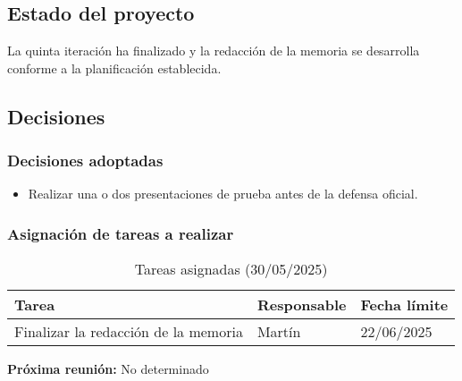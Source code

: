 \subsection{Estado del proyecto}
La quinta iteración ha finalizado y la redacción de la memoria se desarrolla conforme a la planificación establecida.
\subsection{Decisiones}
\subsubsection{Decisiones adoptadas}
\begin{itemize}
    \item Realizar una o dos presentaciones de prueba antes de la defensa oficial.
\end{itemize}
\subsubsection{Asignación de tareas a realizar}
\begin{table}[h]
    \centering
    \begin{tabular}{|p{8cm}|p{3cm}|p{3cm}|}
        \hline
        \textbf{Tarea} & \textbf{Responsable} & \textbf{Fecha límite} \\
        \hline
        Finalizar la redacción de la memoria & Martín & 22/06/2025 \\
        \hline
    \end{tabular}
    \caption{Tareas asignadas (30/05/2025)}
\end{table}
\textbf{Próxima reunión:} No determinado
